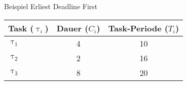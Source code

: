 \newcommand{\showEDFSlide}[1] {\begin{frame}{Beispiel Erliest Deadline First}
	\begin{center}
		\begin{tabular}{l||c|c}
				Task ($\uptau_i$) & Dauer ($C_i$) & Task-Periode ($T_i$)\\\hline\hline
				$\uptau_1$ & 4 & 10\\
				$\uptau_2$ & 2 & 16\\
				$\uptau_3$ & 8 & 20\\
		\end{tabular}
	\end{center}
	
\end{frame}}

%
{%
	\showEDFSlide{\arabic{ct}}
}